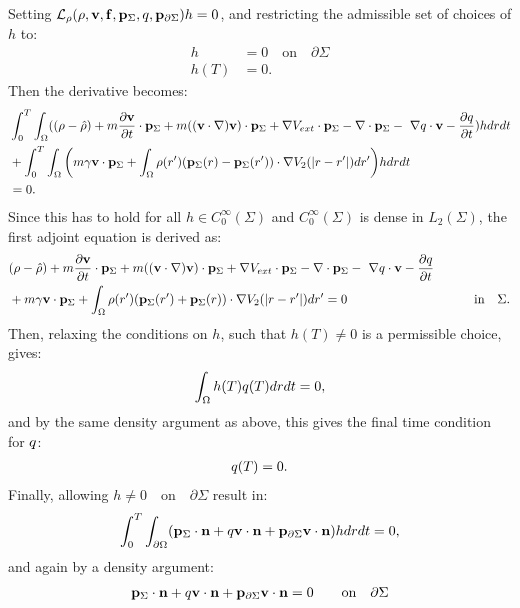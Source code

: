 Setting $\mathcal{L}_\rho(\rho,\mathbf{v},\mathbf{f},\mathbf{p}_\Sigma,q,\mathbf{p}_{\partial \Sigma})h=0$, and restricting the admissible set of choices of $h$ to:
\begin{align*}
h&=0 \quad \text{on} \quad \partial \Sigma\\
h(T)&=0.
\end{align*}
Then the derivative becomes:
\begin{align*}
 &\int_0^T \int_\Omega ( (\rho - \hat {\rho}) +m  \frac{\partial \mathbf{v}}{\partial t}\cdot \mathbf{p}_\Sigma + m  ((\mathbf{v} \cdot \nabla)\mathbf{v} )\cdot \mathbf{p}_\Sigma+ \nabla V_{ext}\cdot \mathbf{p}_\Sigma -\nabla\cdot \mathbf{p}_\Sigma  - \ \nabla q \cdot \mathbf{v}  -  \frac{\partial q}{\partial t}) h dr dt \\
 &+ \int_0^T \int_\Omega \bigg( m \gamma \mathbf{v} \cdot \mathbf{p}_\Sigma+ \int_\Omega  \rho(r')(\mathbf{p}_\Sigma(r) - \mathbf{p}_\Sigma(r')) \cdot\nabla V_2(|r-r'|)   dr'  \bigg)hdr dt\\
 &=0.
\end{align*}
Since this has to hold for all $h \in C_0^\infty(\Sigma)$ and $C_0^\infty(\Sigma)$ is dense in $L_2(\Sigma)$, the first adjoint equation is derived as:
\begin{align}
&(\rho - \hat {\rho}) +m  \frac{\partial \mathbf{v}}{\partial t}\cdot \mathbf{p}_\Sigma + m ( (\mathbf{v} \cdot \nabla)\mathbf{v}) \cdot \mathbf{p}_\Sigma+ \nabla V_{ext}\cdot \mathbf{p}_\Sigma -\nabla\cdot \mathbf{p}_\Sigma  - \ \nabla q \cdot \mathbf{v}  -  \frac{\partial q}{\partial t}\\
&+ m \gamma \mathbf{v} \cdot \mathbf{p}_\Sigma + \int_\Omega  \rho(r')(\mathbf{p}_\Sigma(r') + \mathbf{p}_\Sigma(r)) \cdot\nabla V_2(|r-r'|)   dr'  =0 \qquad\qquad\qquad\qquad\qquad \text{in} \quad \Sigma .\notag
\end{align}
Then, relaxing the conditions on $h$, such that $h(T) \neq 0$ is a permissible choice, gives:
\begin{align*}
\int_\Omega h(T) q(T) dr dt=0,
\end{align*}
and by the same density argument as above, this gives the final time condition for $q$:
\begin{align*}
q(T) = {0} .
\end{align*}
Finally, allowing $h \neq 0 \quad \text{on} \quad \partial \Sigma$ result in:
\begin{align*}
\int_0^T \int_{\partial \Omega} ( \mathbf{p}_\Sigma \cdot \mathbf{n}  +  q \mathbf{v} \cdot \mathbf{n}   +\mathbf{p}_{\partial \Sigma} \mathbf{v} \cdot \mathbf{n})h  dr dt=0,
\end{align*}
and again by a density argument:
\begin{align*}
 \mathbf{p}_\Sigma \cdot \mathbf{n}  +  q \mathbf{v} \cdot \mathbf{n}   +\mathbf{p}_{\partial \Sigma} \mathbf{v} \cdot \mathbf{n} = 0\qquad \text{on} \quad \partial \Sigma
\end{align*}
